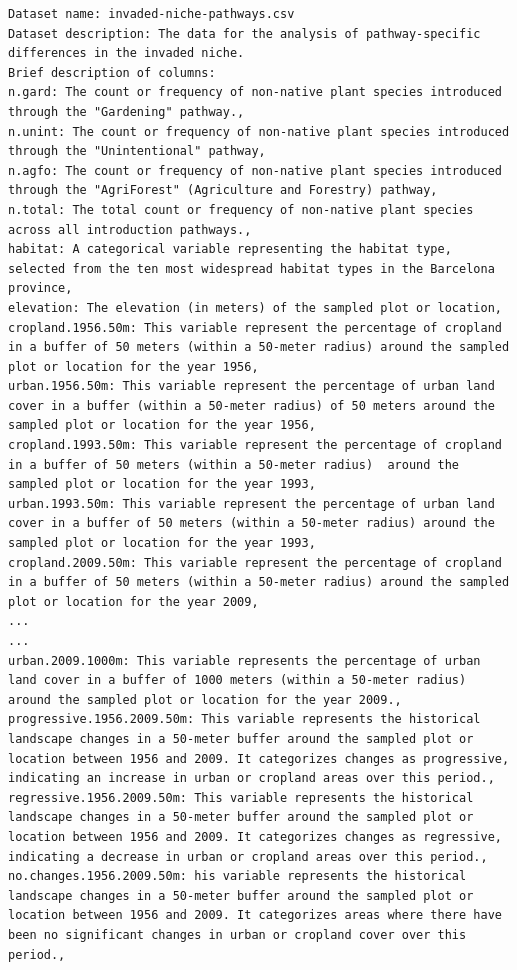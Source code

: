 \begin{verbatim}
Dataset name: invaded-niche-pathways.csv
Dataset description: The data for the analysis of pathway-specific differences in the invaded niche.
Brief description of columns:
n.gard: The count or frequency of non-native plant species introduced through the "Gardening" pathway.,
n.unint: The count or frequency of non-native plant species introduced through the "Unintentional" pathway,
n.agfo: The count or frequency of non-native plant species introduced through the "AgriForest" (Agriculture and Forestry) pathway,
n.total: The total count or frequency of non-native plant species across all introduction pathways.,
habitat: A categorical variable representing the habitat type, selected from the ten most widespread habitat types in the Barcelona province,
elevation: The elevation (in meters) of the sampled plot or location,
cropland.1956.50m: This variable represent the percentage of cropland in a buffer of 50 meters (within a 50-meter radius) around the sampled plot or location for the year 1956,
urban.1956.50m: This variable represent the percentage of urban land cover in a buffer (within a 50-meter radius) of 50 meters around the sampled plot or location for the year 1956,
cropland.1993.50m: This variable represent the percentage of cropland in a buffer of 50 meters (within a 50-meter radius)  around the sampled plot or location for the year 1993,
urban.1993.50m: This variable represent the percentage of urban land cover in a buffer of 50 meters (within a 50-meter radius) around the sampled plot or location for the year 1993,
cropland.2009.50m: This variable represent the percentage of cropland in a buffer of 50 meters (within a 50-meter radius) around the sampled plot or location for the year 2009,
...
...
urban.2009.1000m: This variable represents the percentage of urban land cover in a buffer of 1000 meters (within a 50-meter radius) around the sampled plot or location for the year 2009.,
progressive.1956.2009.50m: This variable represents the historical landscape changes in a 50-meter buffer around the sampled plot or location between 1956 and 2009. It categorizes changes as progressive, indicating an increase in urban or cropland areas over this period.,
regressive.1956.2009.50m: This variable represents the historical landscape changes in a 50-meter buffer around the sampled plot or location between 1956 and 2009. It categorizes changes as regressive, indicating a decrease in urban or cropland areas over this period.,
no.changes.1956.2009.50m: his variable represents the historical landscape changes in a 50-meter buffer around the sampled plot or location between 1956 and 2009. It categorizes areas where there have been no significant changes in urban or cropland cover over this period.,

\end{verbatim}
